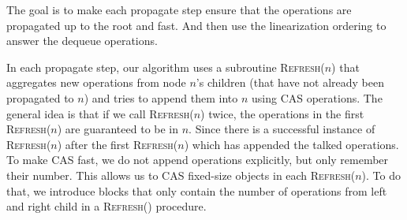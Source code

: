 \documentclass[12pt]{article}
\begin{document}
The goal is to make each propagate step ensure that the operations are propagated up to the root and fast. And then use the linearization ordering to answer the dequeue operations.


In each propagate step, our algorithm uses a subroutine \textsc{Refresh}($n$) that aggregates new operations from node $n$'s children (that have not already been propagated to $n$) and tries to append them into $n$ using CAS operations. The general idea is that if we call \textsc{Refresh}($n$) twice, the operations in the first \textsc{Refresh}($n$) are guaranteed to be in $n$. Since there is a successful instance of \textsc{Refresh}($n$) after the first \textsc{Refresh}($n$) which has appended the talked operations. To make CAS fast, we do not append operations explicitly, but only remember their number. This allows us to CAS fixed-size objects in each \textsc{Refresh}($n$). To do that, we introduce blocks that only contain the number of operations from left and right child in a \textsc{Refresh}() procedure.
\end{document}
